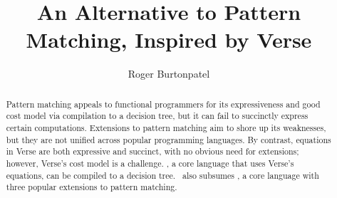 \documentclass[manuscript,screen,review, 12pt, nonacm]{acmart}
\begin{document}
\title{An Alternative to Pattern Matching, Inspired by Verse}

\author{Roger Burtonpatel}



\renewcommand{\shortauthors}{Burtonpatel et al.}

\begin{abstract}

Pattern matching appeals to functional programmers for its expressiveness and
good cost model via compilation to a decision tree, but it can fail to
succinctly express certain computations. Extensions to pattern matching aim to
shore up its weaknesses, but they are not unified across popular programming
languages. By contrast, equations in Verse are both expressive and succinct,
with no obvious need for extensions; however, Verse's cost model is a challenge.
\VMinus, a core language that uses Verse's equations, can be compiled to a
decision tree. \VMinus\ also subsumes \PPlus, a core language with three popular
extensions to pattern matching. 
  \end{abstract}

\maketitle
    







\end{document}
